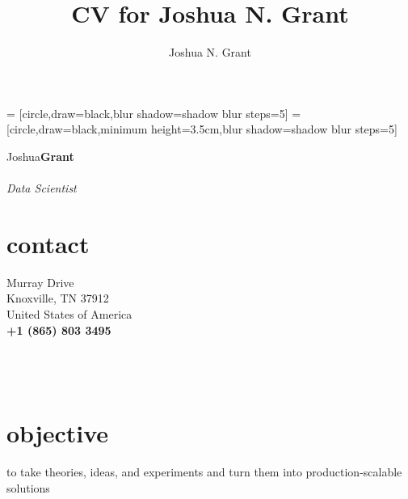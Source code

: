 \documentclass[8pt]{article}
\author{Joshua N. Grant}
\title{CV for Joshua N. Grant}
\begin{document}
% 
% 
 = [circle,draw=black,blur shadow={shadow blur steps=5}]%
 = [circle,draw=black,minimum height=3.5cm,blur shadow={shadow blur steps=5}]%
\begin{minipage}[ht]{.25\linewidth}%
  \setlength{\headsep}{-10pt}
  \setlength{\voffset}{-0.75in}
   {\Large Joshua\LARGE\textbf{Grant}} \\ \\
   {\large \textit{Data Scientist}}
   \section*{\faUser{} contact}%
      Murray Drive \\
     Knoxville, TN 37912 \\
     United States of America  \\
     \textbf{+1 (865) 803 3495} \faMobile \\
     \href{mailto:jngrant9@gmail.com}{\color{linkcolor}{jngrant9@gmail.com \faEnvelope}} \\
     \href{http://notjustadatum.blogspot.com}{\color{linkcolor}{notjustadatum.blogspot.com \faBold}} \\
     \href{http://github.com/sempervent}{\color{linkcolor}{github.com/sempervent \faGithubAlt}} \\
     \href{https://www.linkedin.com/in/joshua-grant-a3842968/}{\color{linkcolor}{\footnotesize linkedin.com/in/joshuanagrant} \faLinkedin}
     \flushleft%
   \section*{\faBullseye{} objective}%
   \flushright
   to take theories, ideas, and experiments and turn them into production-scalable solutions
   \flushleft

\end{minipage}
\end{document}
